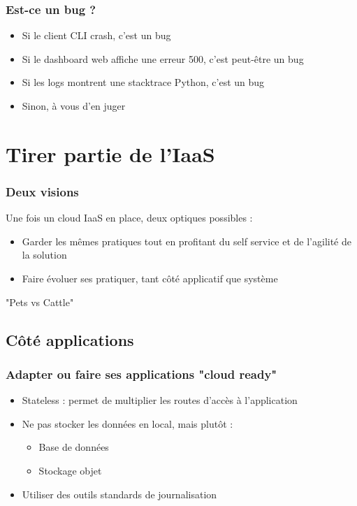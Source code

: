   \begin{frame}
    \frametitle{Est-ce un bug ?}
    \begin{itemize}
      \item Si le client CLI crash, c'est un bug\pause
      \item Si le dashboard web affiche une erreur 500, c'est peut-être un bug\pause
      \item Si les logs montrent une stacktrace Python, c'est un bug\pause
      \item Sinon, à vous d'en juger
    \end{itemize}
  \end{frame}

  \section{Tirer partie de l'IaaS}

  \begin{frame}
    \frametitle{Deux visions}
    Une fois un cloud IaaS en place, deux optiques possibles :
    \begin{itemize}
      \item Garder les mêmes pratiques tout en profitant du self service et de l'agilité de la solution
      \item Faire évoluer ses pratiquer, tant côté applicatif que système
    \end{itemize}
    "Pets vs Cattle"
  \end{frame}

  \subsection{Côté applications}

  \begin{frame}
    \frametitle{Adapter ou faire ses applications "cloud ready"}
    \begin{itemize}
      \item Stateless : permet de multiplier les routes d'accès à l'application
      \item Ne pas stocker les données en local, mais plutôt :
      \begin{itemize}
        \item Base de données
        \item Stockage objet
      \end{itemize}
    \item Utiliser des outils standards de journalisation
    \end{itemize}
  \end{frame}

